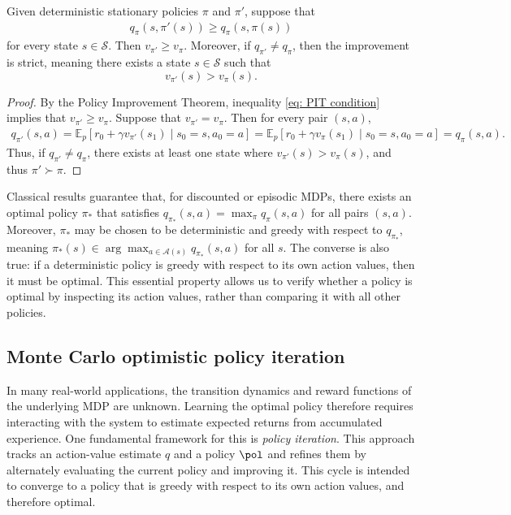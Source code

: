 \begin{lemma}
\label{thm: strict PIT}
Given deterministic stationary policies $\pi$ and $\pi'$, suppose that
\begin{align}
\label{eq: PIT condition}
q_\pi(s,\pi'(s)) \ge q_\pi(s,\pi(s))
\end{align}
for every state $s\in\mathcal S$.
Then \(v_{\pi'} \ge v_\pi\). Moreover, if \(q_{\pi'}\neq q_\pi\), then the improvement is strict, meaning
there exists a state \(s\in\mathcal S\) such that
\[
v_{\pi'}(s)>v_\pi(s).
\]
\end{lemma}
\begin{proof}
By the Policy Improvement Theorem, inequality \eqref{eq: PIT condition} implies that $v_{\pi'} \ge v_\pi$.
Suppose that $v_{\pi'} = v_{\pi}$. Then for every pair $(s,a)$,
\begin{align*}
q_{\pi'}(s,a)
= \mathbb E_p\!\left[r_0+\gamma v_{\pi'}(s_1)\mid s_0=s,a_0=a\right]
= \mathbb E_p\!\left[r_0+\gamma v_{\pi}(s_1)\mid s_0=s,a_0=a\right]
= q_{\pi}(s,a) .
\end{align*}
Thus, if $q_{\pi'} \neq q_\pi$, there exists at least one state where $v_{\pi'}(s) > v_{\pi}(s)$, and thus $\pi' \succ \pi$.
\end{proof}

Classical results guarantee that, for discounted or episodic MDPs,
there exists an optimal policy $\pi_*$ that satisfies $q_{\pi_*}(s,a) = \max_\pi q_\pi(s,a)$ for all pairs $(s,a)$.
Moreover, $\pi_*$ may be chosen to be deterministic and greedy with respect to $q_{\pi_*}$, meaning
$\pi_*(s) \in \arg\max_{a \in \mathcal A(s)} q_{\pi_*}(s,a)$ for all $s$.
The converse is also true: if a deterministic policy is greedy with respect to its own action values, then it must be optimal.
This essential property allows us to verify whether a policy is optimal by inspecting its action values, rather than comparing it with all other policies.

\subsection{Monte Carlo optimistic policy iteration}

In many real-world applications, the transition dynamics and reward functions of the underlying MDP are unknown. Learning the optimal policy therefore requires interacting with the system to estimate expected returns from accumulated experience.
One fundamental framework for this is \textit{policy iteration}.
This approach tracks an action-value estimate $q$ and a policy $\pol$ and refines them by alternately evaluating the current policy and improving it.
This cycle is intended to converge to a policy that is greedy with respect to its own action values, and therefore optimal.

